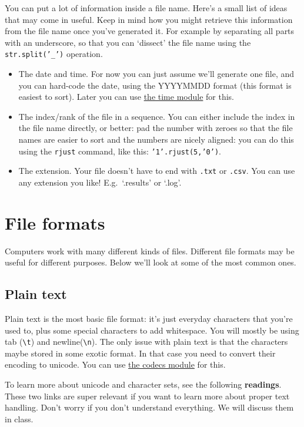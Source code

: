 \documentclass[12pt]{book}
\begin{document}
You can put a lot of information inside a file name. Here's a small list of ideas that may come in useful. Keep in mind how you might retrieve this information from the file name once you've generated it. For example by separating all parts with an underscore, so that you can `dissect' the file name using the \texttt{str.split('\_')} operation.

\begin{itemize}
\item The date and time. For now you can just assume we'll generate one file, and you can hard-code the date, using the YYYYMMDD format (this format is easiest to sort). Later you can use \href{https://docs.python.org/3/library/time.html\#time.strftime}{the time module} for this.
\item The index/rank of the file in a sequence. You can either include the index in the file name directly, or better: pad the number with zeroes so that the file names are easier to sort and the numbers are nicely aligned: you can do this using the \texttt{rjust} command, like this: \texttt{'1'.rjust(5,'0')}.
\item The extension. Your file doesn't have to end with \texttt{.txt} or \texttt{.csv}. You can use any extension you like! E.g.\ `.results' or `.log'.
\end{itemize}

\section{File formats}

Computers work with many different kinds of files. Different file formats may be useful for different purposes. Below we'll look at some of the most common ones.

\subsection{Plain text}
Plain text is the most basic file format: it's just everyday characters that you're used to, plus some special characters to add whitespace. You will mostly be using tab (\texttt{\textbackslash{}t}) and newline(\texttt{\textbackslash{}n}). The only issue with plain text is that the characters maybe stored in some exotic format. In that case you need to convert their encoding to unicode. You can use \href{https://docs.python.org/3.5/library/codecs.html}{the codecs module} for this.

To learn more about unicode and character sets, see the following \textbf{readings}. These two links are super relevant if you want to learn more about proper text handling. Don't worry if you don't understand everything. We will discuss them in class.
\end{document}
